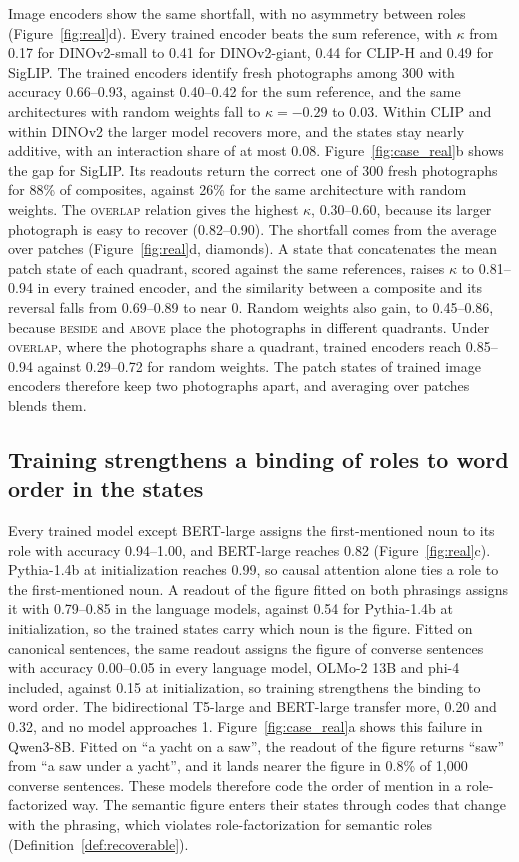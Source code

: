 \documentclass[10pt]{article}
\theoremstyle{plain}
\theoremstyle{remark}
\begin{document}
\label{sec:vision}Image encoders show the same shortfall, with no asymmetry between roles (Figure~\ref{fig:real}d). Every trained encoder beats the sum reference, with $\kappa$ from 0.17 for DINOv2-small to 0.41 for DINOv2-giant, 0.44 for CLIP-H and 0.49 for SigLIP. The trained encoders identify fresh photographs among 300 with accuracy 0.66--0.93, against 0.40--0.42 for the sum reference, and the same architectures with random weights fall to $\kappa = -0.29$ to $0.03$. Within CLIP and within DINOv2 the larger model recovers more, and the states stay nearly additive, with an interaction share of at most 0.08. Figure~\ref{fig:case_real}b shows the gap for SigLIP. Its readouts return the correct one of 300 fresh photographs for 88\% of composites, against 26\% for the same architecture with random weights. The \textsc{overlap} relation gives the highest $\kappa$, 0.30--0.60, because its larger photograph is easy to recover (0.82--0.90). The shortfall comes from the average over patches (Figure~\ref{fig:real}d, diamonds). A state that concatenates the mean patch state of each quadrant, scored against the same references, raises $\kappa$ to 0.81--0.94 in every trained encoder, and the similarity between a composite and its reversal falls from 0.69--0.89 to near 0. Random weights also gain, to 0.45--0.86, because \textsc{beside} and \textsc{above} place the photographs in different quadrants. Under \textsc{overlap}, where the photographs share a quadrant, trained encoders reach 0.85--0.94 against 0.29--0.72 for random weights. The patch states of trained image encoders therefore keep two photographs apart, and averaging over patches blends them.

\subsection{Training strengthens a binding of roles to word order in the states}
\label{sec:roles}

Every trained model except BERT-large assigns the first-mentioned noun to its role with accuracy 0.94--1.00, and BERT-large reaches 0.82 (Figure~\ref{fig:real}c). Pythia-1.4b at initialization reaches 0.99, so causal attention alone ties a role to the first-mentioned noun. A readout of the figure fitted on both phrasings assigns it with 0.79--0.85 in the language models, against 0.54 for Pythia-1.4b at initialization, so the trained states carry which noun is the figure. Fitted on canonical sentences, the same readout assigns the figure of converse sentences with accuracy 0.00--0.05 in every language model, OLMo-2 13B and phi-4 included, against 0.15 at initialization, so training strengthens the binding to word order. The bidirectional T5-large and BERT-large transfer more, 0.20 and 0.32, and no model approaches 1. Figure~\ref{fig:case_real}a shows this failure in Qwen3-8B. Fitted on ``a yacht on a saw'', the readout of the figure returns ``saw'' from ``a saw under a yacht'', and it lands nearer the figure in 0.8\% of 1{,}000 converse sentences. These models therefore code the order of mention in a role-factorized way. The semantic figure enters their states through codes that change with the phrasing, which violates role-factorization for semantic roles (Definition~\ref{def:recoverable}).
\end{document}
